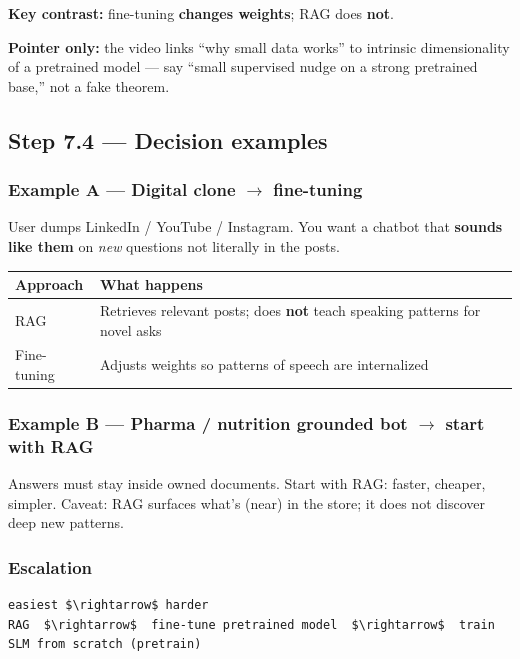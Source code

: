 \documentclass[11pt,a4paper]{article}
\begin{document}
\textbf{Key contrast:} fine-tuning \textbf{changes weights}; RAG does \textbf{not}.


\textbf{Pointer only:} the video links ``why small data works'' to intrinsic dimensionality of a pretrained model --- say ``small supervised nudge on a strong pretrained base,'' not a fake theorem.


\subsection{Step 7.4 --- Decision examples}


\subsubsection{Example A --- Digital clone $\rightarrow$ fine-tuning}

User dumps LinkedIn / YouTube / Instagram. You want a chatbot that \textbf{sounds like them} on \textit{new} questions not literally in the posts.


\begin{table}[ht]
\centering\small
\begin{tabularx}{\textwidth}{@{}YY@{}}
\toprule
\textbf{Approach} & \textbf{What happens} \\
\midrule
RAG & Retrieves relevant posts; does \textbf{not} teach speaking patterns for novel asks \\
Fine-tuning & Adjusts weights so patterns of speech are internalized \\
\bottomrule
\end{tabularx}
\end{table}


\subsubsection{Example B --- Pharma / nutrition grounded bot $\rightarrow$ start with RAG}

Answers must stay inside owned documents. Start with RAG: faster, cheaper, simpler. Caveat: RAG surfaces what's (near) in the store; it does not discover deep new patterns.


\subsubsection{Escalation}

\begin{lstlisting}
easiest $\rightarrow$ harder
RAG  $\rightarrow$  fine-tune pretrained model  $\rightarrow$  train SLM from scratch (pretrain)
\end{lstlisting}
\end{document}
